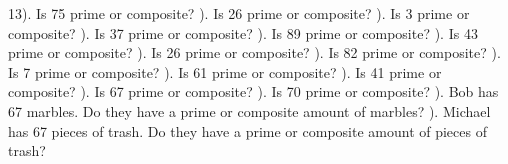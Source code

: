 \documentclass{article}%
\begin{document}
13). Is 75 prime or composite?%
\newline%
\newline%
). Is 26 prime or composite?%
\newline%
\newline%
). Is 3 prime or composite?%
\newline%
\newline%
). Is 37 prime or composite?%
\newline%
\newline%
). Is 89 prime or composite?%
\newline%
\newline%
). Is 43 prime or composite?%
\newline%
\newline%
). Is 26 prime or composite?%
\newline%
\newline%
). Is 82 prime or composite?%
\newline%
\newline%
). Is 7 prime or composite?%
\newline%
\newline%
). Is 61 prime or composite?%
\newline%
\newline%
). Is 41 prime or composite?%
\newline%
\newline%
). Is 67 prime or composite?%
\newline%
\newline%
). Is 70 prime or composite?%
\newline%
\newline%
). Bob has 67 marbles. Do they have a prime or composite amount of marbles?%
\newline%
\newline%
). Michael has 67 pieces of trash. Do they have a prime or composite amount of pieces of trash?%
\end{document}
